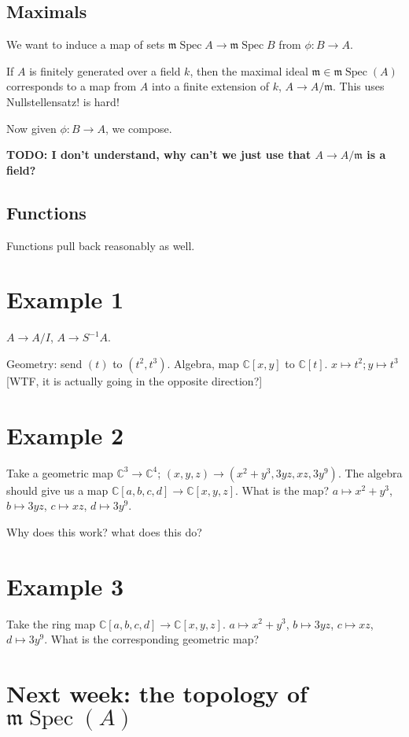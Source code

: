 \documentclass{book}
\newcommand{\C}{\ensuremath{\mathbb{C}}}
\newcommand{\spec}{\operatorname{Spec}}
\newcommand{\m}{\mathfrak{m}}
\newcommand{\mspec}{\m\operatorname{Spec}}
\theoremstyle{definition}
\begin{document}
\subsection{Maximals}
We want to induce a map of sets $\m\spec A \rightarrow \m\spec B$ from
$\phi: B \rightarrow A$.

If $A$ is finitely generated over a field $k$, then the maximal
ideal $\m \in \m\spec(A)$ corresponds to a map from $A$ into a finite extension of $k$,
$A \rightarrow A/\m$. This uses Nullstellensatz! is hard!


Now given $\phi: B \rightarrow A$, we compose.


\textbf{TODO: I don't understand, why can't we just use that $A \rightarrow A/\m$ is a field?}

\subsection{Functions}

Functions pull back reasonably as well.

\section{Example 1 }

$A \rightarrow A/I$, $A \rightarrow S^{-1} A$.

Geometry: send $(t)$ to $(t^2, t^3)$. Algebra, map $\C[x, y]$ to $\C[t]$.
$x \mapsto t^2; y \mapsto t^3$ [WTF, it is actually going in the opposite direction?]

\section{Example 2}
Take a geometric map $\C^3 \rightarrow \C^4$; $(x, y, z) \rightarrow (x^2 + y^3, 3yz, xz, 3y^9)$.
The algebra should give us a map $\C[a, b, c, d] \rightarrow \C[x, y, z]$. What 
is the map? $a \mapsto x^2 + y^3$, $b \mapsto 3yz$, $c \mapsto xz$, $d \mapsto 3y^9$.

Why does this work? what does this do?


\section{Example 3}
Take the ring map 
$\C[a, b, c, d] \rightarrow \C[x, y, z]$. $a \mapsto x^2 + y^3$, $b \mapsto 3yz$, $c \mapsto xz$, $d \mapsto 3y^9$. 
What is the corresponding geometric map?

\section{Next week: the topology of $\mspec(A)$}
\end{document}
